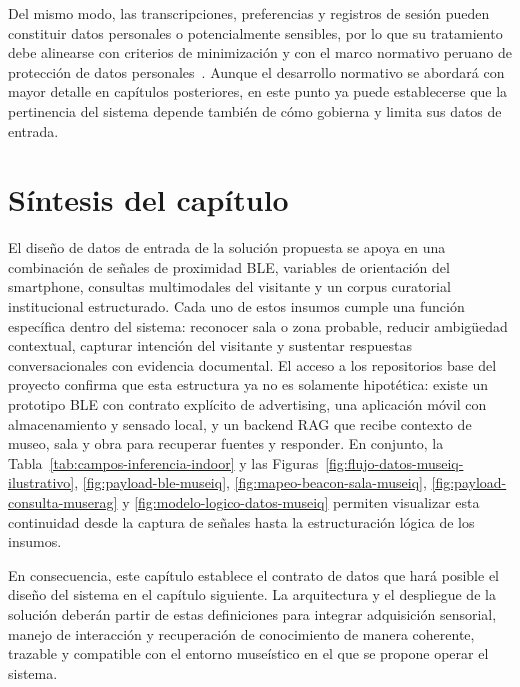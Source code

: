 Del mismo modo, las transcripciones, preferencias y registros de sesión pueden constituir datos personales o potencialmente sensibles, por lo que su tratamiento debe alinearse con criterios de minimización y con el marco normativo peruano de protección de datos personales~\cite{ley29733}. Aunque el desarrollo normativo se abordará con mayor detalle en capítulos posteriores, en este punto ya puede establecerse que la pertinencia del sistema depende también de cómo gobierna y limita sus datos de entrada.

\section{Síntesis del capítulo}

El diseño de datos de entrada de la solución propuesta se apoya en una combinación de señales de proximidad BLE, variables de orientación del smartphone, consultas multimodales del visitante y un corpus curatorial institucional estructurado. Cada uno de estos insumos cumple una función específica dentro del sistema: reconocer sala o zona probable, reducir ambigüedad contextual, capturar intención del visitante y sustentar respuestas conversacionales con evidencia documental. El acceso a los repositorios base del proyecto confirma que esta estructura ya no es solamente hipotética: existe un prototipo BLE con contrato explícito de advertising, una aplicación móvil con almacenamiento y sensado local, y un backend RAG que recibe contexto de museo, sala y obra para recuperar fuentes y responder. En conjunto, la Tabla~\ref{tab:campos-inferencia-indoor} y las Figuras~\ref{fig:flujo-datos-museiq-ilustrativo}, \ref{fig:payload-ble-museiq}, \ref{fig:mapeo-beacon-sala-museiq}, \ref{fig:payload-consulta-muserag} y \ref{fig:modelo-logico-datos-museiq} permiten visualizar esta continuidad desde la captura de señales hasta la estructuración lógica de los insumos.

En consecuencia, este capítulo establece el contrato de datos que hará posible el diseño del sistema en el capítulo siguiente. La arquitectura y el despliegue de la solución deberán partir de estas definiciones para integrar adquisición sensorial, manejo de interacción y recuperación de conocimiento de manera coherente, trazable y compatible con el entorno museístico en el que se propone operar el sistema.
